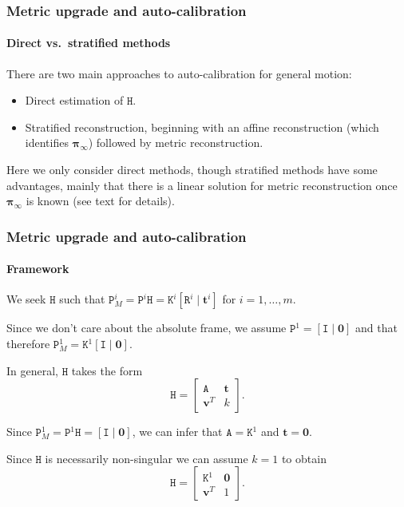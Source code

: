 \documentclass[aspectratio=169]{beamer}
\renewcommand{\vec}[1]{\boldsymbol{#1}}
\newcommand{\mat}[1]{\mathtt{#1}}
\begin{document}
\begin{frame}
\frametitle{Metric upgrade and auto-calibration}
\framesubtitle{Direct vs.\ stratified methods}

There are two main approaches to auto-calibration for general motion:
\begin{itemize}
\item \alert{Direct} estimation of $\mat{H}$.
\item \alert{Stratified} reconstruction, beginning with an affine
  reconstruction (which identifies $\vec{\pi}_{\infty}$) followed
  by metric reconstruction.
\end{itemize}

\medskip

Here we only consider direct methods, though stratified methods have
some advantages, mainly that there is a linear solution for
metric reconstruction once $\vec{\pi}_{\infty}$ is known (see text
for details).

\end{frame}


\begin{frame}
\frametitle{Metric upgrade and auto-calibration}
\framesubtitle{Framework}

We seek $\mat{H}$ such that $\mat{P}^i_M = \mat{P}^i\mat{H} =
\mat{K}^i[\mat{R}^i \mid \vec{t}^i]$ for $i = 1, \ldots, m$.

\medskip

Since we don't care about the absolute frame, we assume
$\mat{P}^1 = [ \mat{I} \mid \vec{0}]$ and that therefore $\mat{P}^1_M =
\mat{K}^1[\mat{I} \mid \vec{0}]$.

\medskip

In general, $\mat{H}$ takes the form
\begin{equation*}
\mat{H} = \begin{bmatrix} \mat{A} & \vec{t} \\ \vec{v}^T & k \end{bmatrix}.
\end{equation*}

\medskip

Since $\mat{P}^1_M = \mat{P}^1\mat{H} = [\mat{I} \mid \vec{0}]$, we can infer
that $\mat{A}=\mat{K}^1$ and $\vec{t}=\vec{0}$.

\medskip

Since $\mat{H}$ is necessarily non-singular we can assume $k=1$ to obtain
\begin{equation*}
\mat{H} = \begin{bmatrix} \mat{K}^1 & \vec{0} \\ \vec{v}^T & 1 \end{bmatrix}.
\end{equation*}

\end{frame}
\end{document}
